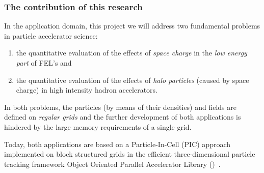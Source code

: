 \documentclass[11pt,pdftex]{article}
\begin{document}
\subsubsection{The contribution of this research}
In the application domain, this project we will address two fundamental problems in particle accelerator science: 
\begin{enumerate}
\item the quantitative evaluation of the effects of \emph{space charge}
  in the \emph{low energy part} of FEL's and
\item the quantitative evaluation of the effects of \emph{halo particles} (caused by space charge)
  in high intensity hadron accelerators.
\end{enumerate}

In both problems, the particles (by means of their densities) and fields
are defined on \emph{regular grids} and the further development of both
applications is hindered by the large memory requirements of a single
grid.

Today, both applications are based on a Particle-In-Cell (PIC) approach
implemented on block structured grids in the efficient three-dimensional
particle tracking framework Object Oriented Parallel Accelerator Library
(\opal)~\cite{opal:1}.  
  
\end{document}
